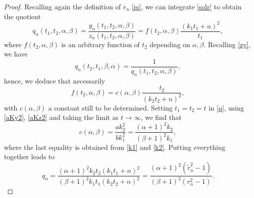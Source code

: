 \documentclass[10pt, reqno]{amsart}
\numberwithin{equation}{section}
\numberwithin{equation}{section}
\begin{document}
\begin{proof}
Recalling again the definition of $r_n$ \eqref{rs}, we can integrate \eqref{solr} to obtain the quotient
\begin{equation}
q_n(t_1,t_2,\alpha,\beta)=\frac{y_n(t_1,t_2,\alpha,\beta)}{z_n(t_1,t_2,\alpha,\beta)}=f(t_2,\alpha,\beta)\frac{(k_1t_1+n)^2}{t_1},\label{q}
\end{equation}
where $f(t_2,\alpha,\beta)$ is an arbitrary function of $t_2$ depending on $\alpha,\beta$. Recalling \eqref{zy}, we have
\begin{equation*}
q_n(t_2,t_1,\beta,\alpha)=\frac{1}{q_n(t_1,t_2,\alpha,\beta)},
\end{equation*}
hence, we deduce that necessarily
\begin{equation*}
f(t_2,\alpha,\beta)=c(\alpha,\beta) \frac{t_2}{(k_2t_2+n)^2},
\end{equation*}
with $c(\alpha,\beta)$ a constant still to be determined. Setting $t_1=t_2=t$ in \eqref{q}, using \eqref{aKy2}, \eqref{aKz2} and taking the limit as $t\to\infty$, we find that
\begin{equation*}
c(\alpha,\beta)=\frac{ak_2^2}{bk_1^2}=\frac{(\alpha+1)^2k_2}{(\beta+1)^2k_1},
\end{equation*}
where the last equality is obtained from \eqref{k1} and \eqref{k2}. Putting everything together leads to
\begin{equation} 
q_n=\frac{(\alpha+1)^2k_2t_2(k_1t_1+n)^2}{(\beta+1)^2k_1t_1(k_2t_2+n)^2}=\frac{(\alpha+1)^2(\tilde{r}_n^2-1)}{(\beta+1)^2(r_n^2-1)}.\label{solq}
\end{equation} 


\end{proof}
\end{document}
